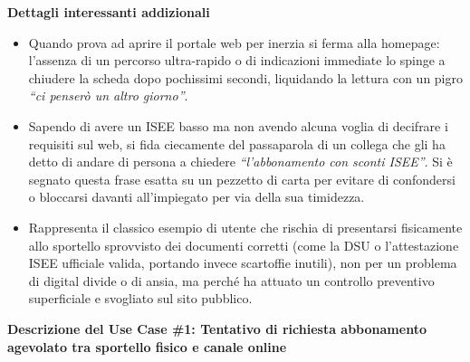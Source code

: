 \documentclass[11pt,a4paper]{article}
\begin{document}
\vspace{0.3cm}


\begin{tcolorbox}[colback=backgroundColor!50,colframe=borderColor,arc=2mm]
    \textbf{Dettagli interessanti addizionali} \\[4pt]
    {\small
    \begin{itemize}[leftmargin=*]
        \item Quando prova ad aprire il portale web per inerzia si ferma alla homepage: l'assenza di un percorso ultra-rapido o di indicazioni immediate lo spinge a chiudere la scheda dopo pochissimi secondi, liquidando la lettura con un pigro \textit{``ci penserò un altro giorno''}.
        \item Sapendo di avere un ISEE basso ma non avendo alcuna voglia di decifrare i requisiti sul web, si fida ciecamente del passaparola di un collega che gli ha detto di andare di persona a chiedere \textit{``l'abbonamento con sconti ISEE''}. Si è segnato questa frase esatta su un pezzetto di carta per evitare di confondersi o bloccarsi davanti all'impiegato per via della sua timidezza.
        \item Rappresenta il classico esempio di utente che rischia di presentarsi fisicamente allo sportello sprovvisto dei documenti corretti (come la DSU o l'attestazione ISEE ufficiale valida, portando invece scartoffie inutili), non per un problema di digital divide o di ansia, ma perché ha attuato un controllo preventivo superficiale e svogliato sul sito pubblico.
    \end{itemize}
    }
\end{tcolorbox}

\begin{tcolorbox}[colback=primaryColor!10,colframe=primaryColor,arc=2mm]
    \textbf{Descrizione del Use Case \#1: Tentativo di richiesta abbonamento agevolato tra sportello fisico e canale online}
\end{tcolorbox}

\vspace{0.3cm}
\end{document}
